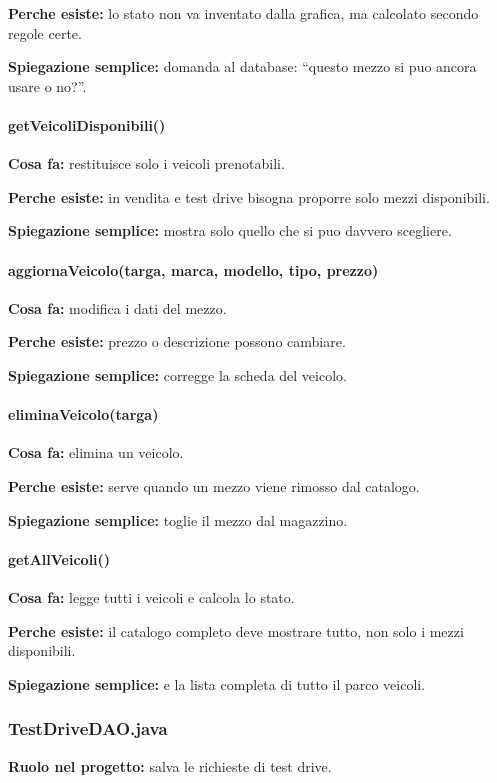 \documentclass[12pt,a4paper]{article}
\begin{document}
\textbf{Perche esiste:} lo stato non va inventato dalla grafica, ma calcolato secondo regole certe.

\textbf{Spiegazione semplice:} domanda al database: ``questo mezzo si puo ancora usare o no?''.

\paragraph{getVeicoliDisponibili()}
\textbf{Cosa fa:} restituisce solo i veicoli prenotabili.

\textbf{Perche esiste:} in vendita e test drive bisogna proporre solo mezzi disponibili.

\textbf{Spiegazione semplice:} mostra solo quello che si puo davvero scegliere.

\paragraph{aggiornaVeicolo(targa, marca, modello, tipo, prezzo)}
\textbf{Cosa fa:} modifica i dati del mezzo.

\textbf{Perche esiste:} prezzo o descrizione possono cambiare.

\textbf{Spiegazione semplice:} corregge la scheda del veicolo.

\paragraph{eliminaVeicolo(targa)}
\textbf{Cosa fa:} elimina un veicolo.

\textbf{Perche esiste:} serve quando un mezzo viene rimosso dal catalogo.

\textbf{Spiegazione semplice:} toglie il mezzo dal magazzino.

\paragraph{getAllVeicoli()}
\textbf{Cosa fa:} legge tutti i veicoli e calcola lo stato.

\textbf{Perche esiste:} il catalogo completo deve mostrare tutto, non solo i mezzi disponibili.

\textbf{Spiegazione semplice:} e la lista completa di tutto il parco veicoli.

\subsubsection*{TestDriveDAO.java}
\textbf{Ruolo nel progetto:} salva le richieste di test drive.
\end{document}
